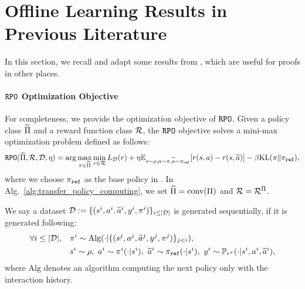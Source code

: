 \section{Offline Learning Results in Previous Literature}\label{appx:adaption_offline}
In this section, we recall and adapt some results from \citep{liu2024provably}, which are useful for proofs in other places.
\paragraph{${\texttt{RPO}}$ Optimization Objective}
For completeness, we provide the optimization objective of ${\texttt{RPO}}$.
Given a policy class $\widetilde{\Pi}$ and a reward function class $\mathcal{R}$, the ${\texttt{RPO}}$ objective solves a mini-max optimization problem defined as follows:
\begin{align}
    {\texttt{RPO}}(\widetilde{\Pi},\mathcal{R},\mathcal{D},\eta) = \arg\max_{\pi\in\widetilde{\Pi}}\min_{r\in\mathcal{R}} L_{\mathcal{D}}(r) + \eta \mathbb{E}_{s\sim\rho,a\sim\pi,\widetilde{a}\sim\pi_{\texttt{ref}}}[r(s,a)-r(s,\widetilde{a})] - \beta \text{KL}(\pi\|\pi_{\texttt{ref}}), \label{eq:RPO_objective} 
\end{align}
where we choose $\pi_{\texttt{ref}}$ as the base policy in \citep{liu2024provably}.
In Alg.~\ref{alg:transfer_policy_computing}, we set $\widetilde{\Pi} = \text{conv}(\Pi)$ and $\mathcal{R} = \mathcal{R}^\Pi$.
\begin{condition}\label{cond:seq_data}
    We say a dataset $\mathcal{D} := \{(s^i,a^i,\widetilde{a}^i,y^i,\pi^i)\}_{i\leq |\mathcal{D}|}$ is generated sequentially, if it is generated following:
    \begin{align*}
        \forall i\leq |\mathcal{D}|,\quad & \pi^i \sim \text{Alg}(\cdot|\{(s^j,a^j,\widetilde{a}^j,y^j,\pi^j)\}_{j<i}),\\
        & s^i\sim\rho,~a^i\sim\pi^i(\cdot|s^i),~\widetilde{a}^i\sim\pi_{\texttt{ref}}(\cdot|s^i),~y^i\sim {\mathbb{P}}_{r^*}(\cdot|s^i,a^i,\widetilde{a}^i),
    \end{align*}
    where $\text{Alg}$ denotes an algorithm computing the next policy only with the interaction history.
\end{condition}


